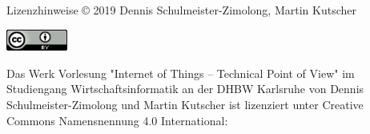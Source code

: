 {
    \tiny
    \begin{frame}{Lizenzhinweise}
            © 2019 Dennis Schulmeister-Zimolong, Martin Kutscher
            \medskip

            \medskip

            \includegraphics[width=2cm]{include/cc-by.png}
            \medskip

            Das Werk Vorlesung "Internet of Things – Technical Point of View" im Studiengang
            Wirtschaftsinformatik an der DHBW Karlsruhe von Dennis Schulmeister-Zimolong
            und Martin Kutscher ist lizenziert unter Creative Commons Namensnennung 4.0 International:
            \medskip

    \end{frame}
}
